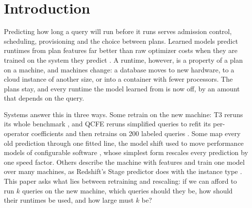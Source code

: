\documentclass[sigconf,review]{acmart}
\begin{document}
\section{Introduction}
\label{sec:intro}
Predicting how long a query will run before it runs serves admission
control, scheduling, provisioning and the choice between plans. Learned
models predict runtimes from plan features far better than raw optimizer
costs when they are trained on the system they predict
\cite{ganapathi2009,akdere2012,marcus2019,sun2020}. A runtime, however, is
a property of a plan on a machine, and machines change: a database moves to
new hardware, to a cloud instance of another size, or into a container
with fewer processors. The plans stay, and every runtime the model learned
from is now off, by an amount that depends on the query.

Systems answer this in three ways. Some retrain on the new machine: T3
reruns its whole benchmark \cite{rieger2025t3}, and QCFE reruns simplified
queries to refit its per-operator coefficients and then retrains on 200
labeled queries \cite{yan2024qcfe}. Some map every old prediction through
one fitted line, the model shift used to move performance models of
configurable software \cite{valov2017,jamshidi2017}, whose simplest form
rescales every prediction by one speed factor. Others describe the machine
with features and train one model over many machines, as Redshift's Stage
predictor does with the instance type \cite{wu2024stage}. This paper asks
what lies between retraining and rescaling: if we can afford to run $k$
queries on the new machine, which queries should they be, how should their
runtimes be used, and how large must $k$ be?
\end{document}
